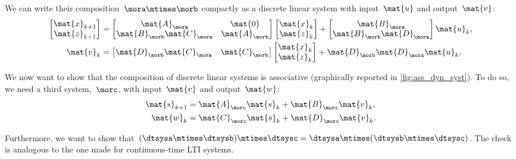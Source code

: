 We can write their composition~$\mora\mtimes \morb$ compactly as a discrete linear system with input~$\mat{u}$ and output~$\mat{v}$:
%
\begin{equation}
    \label{eq:dlin-3}
    \begin{aligned}
        \begin{bmatrix}
            \mat{x}_{k+1} \\
            \mat{z}_{k+1}
        \end{bmatrix} & =
        \begin{bmatrix}
            \mat{A}_\mora               & \mat{0}       \\
            \mat{B}_\morb \mat{C}_\mora & \mat{A}_\morb
        \end{bmatrix}
        \begin{bmatrix}
            \mat{x}_k \\ \mat{z}_k
        \end{bmatrix}
        +
        \begin{bmatrix}
            \mat{B}_\mora \\ \mat{B}_\morb \mat{D}_\mora
        \end{bmatrix}\mat{u}_k, \\
        \mat{v}_k        & =
        \begin{bmatrix}
            \mat{D}_\morb \mat{C}_\mora & \mat{C}_\morb
        \end{bmatrix}
        \begin{bmatrix}
            \mat{x}_k \\ \mat{z}_k
        \end{bmatrix}+ \mat{D}_\morb \mat{D}_\mora \mat{u}_k.
    \end{aligned}
\end{equation}

We now want to show that the composition of discrete linear systems is associative (graphically reported in \cref{fig:ass_dyn_syst}).
To do so, we need a third system,~$\morc$, with input~$\mat{v}$ and output~$\mat{w}$:
\begin{equation}
    \label{eq:dlin-4}
    \begin{aligned}
        \mat{s}_{k+1} & = \mat{A}_\morc \mat{s}_k + \mat{B}_\morc \mat{v}_k, \\
        \mat{w}_{k}   & = \mat{C}_\morc \mat{s}_k+ \mat{D}_\morc \mat{v}_k.
    \end{aligned}
\end{equation}

Furthermore, we want to show that~$(\dtsysa\mtimes \dtsysb)\mtimes \dtsysc=\dtsysa\mtimes (\dtsysb\mtimes \dtsysc)$.
The check is analogous to the one made for continuous-time LTI systems.

